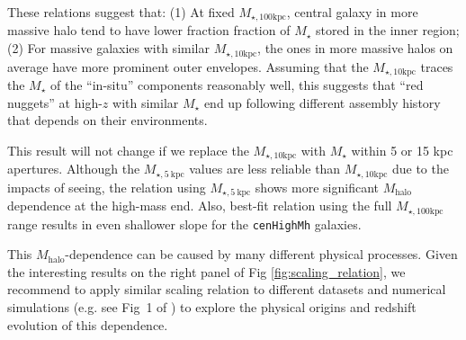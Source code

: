 \documentclass{emulateapj}
\def\redm{\texttt{redMaPPer}}
\def\rbcg{\texttt{cenHighMh}}
\def\mstar{{$M_{\star}$}}
\def\mhalo{{$M_{\mathrm{halo}}$}}
\def\minn{{$M_{\star,10\mathrm{kpc}}$}}
\def\mtot{{$M_{\star,100\mathrm{kpc}}$}}
\begin{document}
\begin{CJK*}{UTF8}{gbsn}
    These relations suggest that: (1) At fixed \mtot{}, central galaxy in more 
    massive halo tend to have lower fraction fraction of \mstar{} stored in the inner
    region; (2) For massive galaxies with similar \minn{}, the ones in more 
    massive halos on average have more prominent outer envelopes.  
    Assuming that the \minn{} traces the \mstar{} of the ``in-situ'' components 
    reasonably well, this suggests that ``red nuggets'' at high-$z$ with similar 
    \mstar{} end up following different assembly history that depends on their 
    environments. 
        
    This result will not change if we replace the \minn{} with \mstar{} within 5 or 
    15 kpc apertures.
    Although the $M_{\star, 5\ \mathrm{kpc}}$ values are less reliable than \minn{} 
    due to the impacts of seeing, the relation using $M_{\star, 5\ \mathrm{kpc}}$ shows 
    more significant \mhalo{} dependence at the high-mass end.
    Also, best-fit relation using the full \mtot{} range results in even shallower 
    slope for the \rbcg{} galaxies.          
    
   
    This \mhalo{}-dependence can be caused by many different physical processes. 
    Given the interesting results on the right panel of Fig \ref{fig:scaling_relation},
    we recommend to apply similar scaling relation to different datasets and 
    numerical simulations (e.g. see Fig~1 of \citealt{Wellons2016b}) to explore the 
    physical origins and redshift evolution of this dependence. 



\end{CJK*}
\end{document}
